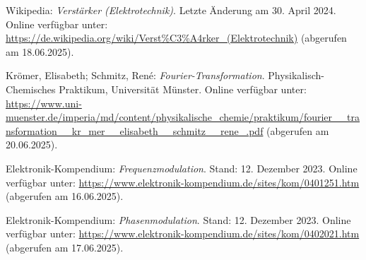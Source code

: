 \begin{thebibliography}{1}
Wikipedia: \emph{Verstärker (Elektrotechnik)}. Letzte Änderung am 30. April 2024.  
Online verfügbar unter: \url{https://de.wikipedia.org/wiki/Verst%C3%A4rker_(Elektrotechnik)} (abgerufen am 18.06.2025).

Krömer, Elisabeth; Schmitz, René: \emph{Fourier-Transformation}. Physikalisch-Chemisches Praktikum, Universität Münster.  
Online verfügbar unter: \url{https://www.uni-muenster.de/imperia/md/content/physikalische_chemie/praktikum/fourier__transformation__kr_mer__elisabeth__schmitz__rene_.pdf} (abgerufen am 20.06.2025).

Elektronik-Kompendium: \emph{Frequenzmodulation}. Stand: 12. Dezember 2023.  
Online verfügbar unter: \url{https://www.elektronik-kompendium.de/sites/kom/0401251.htm} (abgerufen am 16.06.2025).

Elektronik-Kompendium: \emph{Phasenmodulation}. Stand: 12. Dezember 2023.  
Online verfügbar unter: \url{https://www.elektronik-kompendium.de/sites/kom/0402021.htm} (abgerufen am 17.06.2025).

\end{thebibliography}

\clearpage
